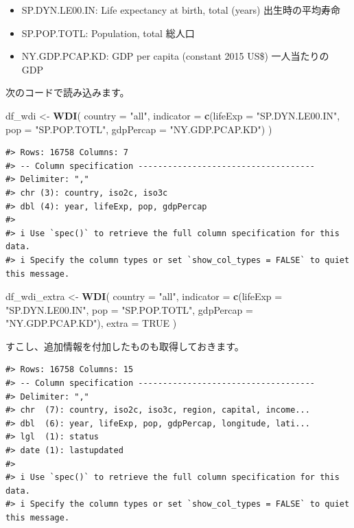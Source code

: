 \documentclass[
  xelatex, ja=standard]{bxjsbook}
\newenvironment{Shaded}{\begin{snugshade}}{\end{snugshade}}
\newcommand{\AttributeTok}[1]{\textcolor[rgb]{0.13,0.29,0.53}{#1}}
\newcommand{\ConstantTok}[1]{\textcolor[rgb]{0.56,0.35,0.01}{#1}}
\newcommand{\FunctionTok}[1]{\textcolor[rgb]{0.13,0.29,0.53}{\textbf{#1}}}
\newcommand{\NormalTok}[1]{#1}
\newcommand{\OtherTok}[1]{\textcolor[rgb]{0.56,0.35,0.01}{#1}}
\newcommand{\StringTok}[1]{\textcolor[rgb]{0.31,0.60,0.02}{#1}}
\providecommand{\tightlist}{%
  \setlength{\itemsep}{0pt}\setlength{\parskip}{0pt}}
\theoremstyle{definition}
\theoremstyle{definition}
\theoremstyle{definition}
\theoremstyle{definition}
\theoremstyle{remark}
\begin{document}
\begin{itemize}
\tightlist
\item
  SP.DYN.LE00.IN: Life expectancy at birth, total (years) 出生時の平均寿命
\item
  SP.POP.TOTL: Population, total 総人口
\item
  NY.GDP.PCAP.KD: GDP per capita (constant 2015 US\$) 一人当たりの　GDP
\end{itemize}

次のコードで読み込みます。

\begin{Shaded}
\begin{Highlighting}[]
\NormalTok{df\_wdi }\OtherTok{\textless{}{-}} \FunctionTok{WDI}\NormalTok{(}
  \AttributeTok{country =} \StringTok{"all"}\NormalTok{, }
  \AttributeTok{indicator =} \FunctionTok{c}\NormalTok{(}\AttributeTok{lifeExp =} \StringTok{"SP.DYN.LE00.IN"}\NormalTok{, }\AttributeTok{pop =} \StringTok{"SP.POP.TOTL"}\NormalTok{, }\AttributeTok{gdpPercap =} \StringTok{"NY.GDP.PCAP.KD"}\NormalTok{)}
\NormalTok{)}
\end{Highlighting}
\end{Shaded}

\begin{verbatim}
#> Rows: 16758 Columns: 7
#> -- Column specification ------------------------------------
#> Delimiter: ","
#> chr (3): country, iso2c, iso3c
#> dbl (4): year, lifeExp, pop, gdpPercap
#> 
#> i Use `spec()` to retrieve the full column specification for this data.
#> i Specify the column types or set `show_col_types = FALSE` to quiet this message.
\end{verbatim}

\begin{Shaded}
\begin{Highlighting}[]
\NormalTok{df\_wdi\_extra }\OtherTok{\textless{}{-}} \FunctionTok{WDI}\NormalTok{(}
  \AttributeTok{country =} \StringTok{"all"}\NormalTok{, }
  \AttributeTok{indicator =} \FunctionTok{c}\NormalTok{(}\AttributeTok{lifeExp =} \StringTok{"SP.DYN.LE00.IN"}\NormalTok{, }\AttributeTok{pop =} \StringTok{"SP.POP.TOTL"}\NormalTok{, }\AttributeTok{gdpPercap =} \StringTok{"NY.GDP.PCAP.KD"}\NormalTok{), }
  \AttributeTok{extra =} \ConstantTok{TRUE}
\NormalTok{)}
\end{Highlighting}
\end{Shaded}

すこし、追加情報を付加したものも取得しておきます。

\begin{verbatim}
#> Rows: 16758 Columns: 15
#> -- Column specification ------------------------------------
#> Delimiter: ","
#> chr  (7): country, iso2c, iso3c, region, capital, income...
#> dbl  (6): year, lifeExp, pop, gdpPercap, longitude, lati...
#> lgl  (1): status
#> date (1): lastupdated
#> 
#> i Use `spec()` to retrieve the full column specification for this data.
#> i Specify the column types or set `show_col_types = FALSE` to quiet this message.
\end{verbatim}
\end{document}

